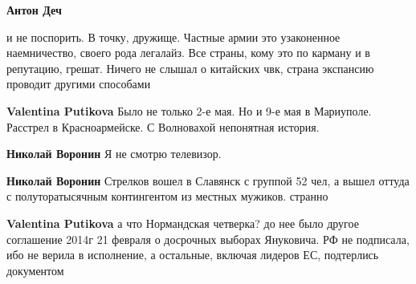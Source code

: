 \begin{itemize}
\begin{itemize}
 
\textbf{Антон Деч} 

и не поспорить. В точку, дружище. Частные армии это узаконенное наемничество,
своего рода легалайз. Все страны, кому это по карману и в репутацию, грешат.
Ничего не слышал о китайских чвк, страна экспансию проводит другими способами

 
\textbf{Valentina Putikova} Было не только 2-е мая. Но и 9-е мая в Мариуполе. Расстрел в Красноармейске. С Волновахой непонятная история.

 
\textbf{Николай Воронин} Я не смотрю телевизор.

 
\textbf{Николай Воронин} Стрелков вошел в Славянск с группой 52 чел, а вышел оттуда с полуторатысячным контингентом из местных мужиков. странно

 
\textbf{Valentina Putikova} а что Нормандская четверка? до нее было другое соглашение 2014г 21 февраля о досрочных выборах Януковича. РФ не подписала, ибо не верила в исполнение, а остальные, включая лидеров ЕС, подтерлись документом

 

\end{itemize}
\end{itemize}
